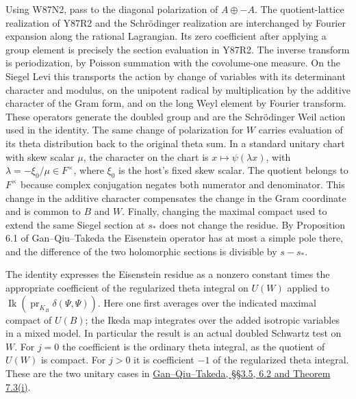 Using W87N2, pass to the diagonal
polarization of $A\oplus-A$. The quotient-lattice realization of
Y87R2 and the Schr\"odinger realization are interchanged by Fourier
expansion along the rational Lagrangian. Its zero coefficient
after applying a group element is precisely the section evaluation
in Y87R2. The inverse transform is periodization, by Poisson
summation with the covolume-one measure. On the Siegel Levi this
transports the action by change of variables with its determinant
character and modulus, on the unipotent radical by multiplication
by the additive character of the Gram form, and on the long Weyl
element by Fourier transform. These operators generate the
doubled group and are the Schr\"odinger Weil action used in the
identity. The same change of polarization for $W$ carries
evaluation of its theta distribution back to the original theta
sum. In a standard unitary chart with skew scalar $\mu$, the character
on the chart is $x\mapsto\psi(\lambda x)$, with
$\lambda=-\xi_0/\mu\in F^\times$, where $\xi_0$ is the host's
fixed skew scalar. The quotient belongs to $F^\times$ because complex
conjugation negates both numerator and denominator. This change in
the additive character compensates the change in the Gram coordinate
and is common to $B$ and $W$. Finally, changing the maximal compact
used to extend the same Siegel section at $s_*$ does not change the
residue. By Proposition 6.1 of Gan--Qiu--Takeda the Eisenstein
operator has at most a simple pole there, and the difference of the
two holomorphic sections is divisible by $s-s_*$.

The identity expresses the Eisenstein residue as a nonzero
constant times the appropriate coefficient of the regularized
theta integral on $U(W)$ applied to
$\operatorname{Ik}(\operatorname{pr}_{K_B}\delta(\Psi,\Psi))$.
Here one first averages over the indicated maximal compact of
$U(B)$; the Ikeda map integrates over the added isotropic variables
in a mixed model. In particular the result is an actual doubled
Schwartz test on $W$. For $j=0$ the coefficient is the ordinary
theta integral, as the quotient of $U(W)$ is compact. For $j>0$
it is coefficient $-1$ of the regularized theta integral.
These are the two unitary cases in
\href{https://arxiv.org/pdf/1207.4709}{Gan--Qiu--Takeda,
\S\S3.5, 6.2 and Theorem 7.3(i)}.

